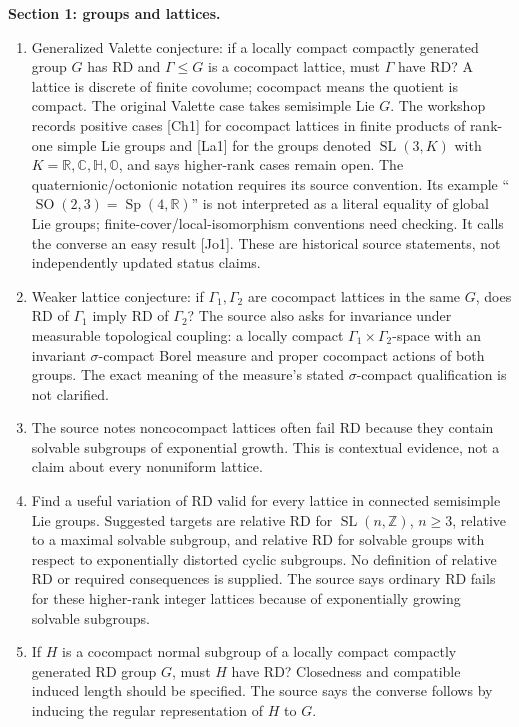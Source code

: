 \documentclass[11pt]{article}
\newcommand{\Z}{\mathbb{Z}}
\newcommand{\R}{\mathbb{R}}
\newcommand{\C}{\mathbb{C}}
\begin{document}
\textbf{Section 1: groups and lattices.}
\begin{enumerate}
\item Generalized Valette conjecture: if a locally compact compactly generated group $G$ has RD and $\Gamma\leq G$ is a cocompact lattice, must $\Gamma$ have RD? A lattice is discrete of finite covolume; cocompact means the quotient is compact. The original Valette case takes semisimple Lie $G$. The workshop records positive cases [Ch1] for cocompact lattices in finite products of rank-one simple Lie groups and [La1] for the groups denoted $\operatorname{SL}(3,K)$ with $K=\R,\C,\mathbb H,\mathbb O$, and says higher-rank cases remain open. The quaternionic/octonionic notation requires its source convention. Its example ``$\operatorname{SO}(2,3)=\operatorname{Sp}(4,\R)$'' is not interpreted as a literal equality of global Lie groups; finite-cover/local-isomorphism conventions need checking. It calls the converse an easy result [Jo1]. These are historical source statements, not independently updated status claims.
\item Weaker lattice conjecture: if $\Gamma_1,\Gamma_2$ are cocompact lattices in the same $G$, does RD of $\Gamma_1$ imply RD of $\Gamma_2$? The source also asks for invariance under measurable topological coupling: a locally compact $\Gamma_1\times\Gamma_2$-space with an invariant $\sigma$-compact Borel measure and proper cocompact actions of both groups. The exact meaning of the measure's stated $\sigma$-compact qualification is not clarified.
\item The source notes noncocompact lattices often fail RD because they contain solvable subgroups of exponential growth. This is contextual evidence, not a claim about every nonuniform lattice.
\item Find a useful variation of RD valid for every lattice in connected semisimple Lie groups. Suggested targets are relative RD for $\operatorname{SL}(n,\Z)$, $n\geq3$, relative to a maximal solvable subgroup, and relative RD for solvable groups with respect to exponentially distorted cyclic subgroups. No definition of relative RD or required consequences is supplied. The source says ordinary RD fails for these higher-rank integer lattices because of exponentially growing solvable subgroups.
\item If $H$ is a cocompact normal subgroup of a locally compact compactly generated RD group $G$, must $H$ have RD? Closedness and compatible induced length should be specified. The source says the converse follows by inducing the regular representation of $H$ to $G$.

\end{enumerate}
\end{document}
